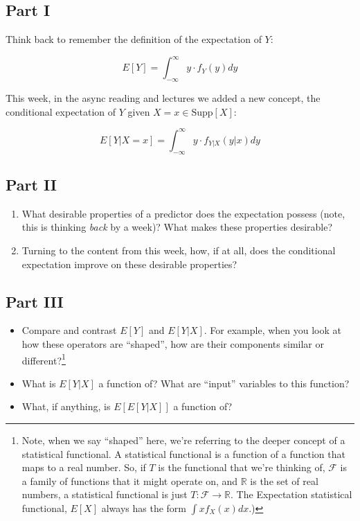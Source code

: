 \documentclass[
]{book}
\providecommand{\tightlist}{%
  \setlength{\itemsep}{0pt}\setlength{\parskip}{0pt}}
\theoremstyle{definition}
\theoremstyle{definition}
\theoremstyle{definition}
\theoremstyle{definition}
\theoremstyle{remark}
\begin{document}
\hypertarget{part-i}{%
\subsection{Part I}\label{part-i}}

Think back to remember the definition of the expectation of \(Y\):

\[
  E[Y] = \int_{-\infty}^\infty y \cdot f_{Y}(y) dy
\]

This week, in the async reading and lectures we added a new concept, the conditional expectation of \(Y\) given \(X=x \in \text{Supp}[X]\):

\[
  E[Y|X=x] =  \int_{-\infty}^\infty y \cdot f_{Y|X}(y|x) dy
\]

\hypertarget{part-ii}{%
\subsection{Part II}\label{part-ii}}

\begin{enumerate}
\def\labelenumi{\arabic{enumi}.}
\tightlist
\item
  What desirable properties of a predictor does the expectation possess (note, this is thinking \emph{back} by a week)? What makes these properties desirable?
\item
  Turning to the content from this week, how, if at all, does the conditional expectation improve on these desirable properties?
\end{enumerate}

\hypertarget{part-iii}{%
\subsection{Part III}\label{part-iii}}

\begin{itemize}
\item
  Compare and contrast \(E[Y]\) and \(E[Y|X]\). For example, when you look at how these operators are ``shaped'', how are their components similar or different?\footnote{Note, when we say ``shaped'' here, we're referring to the deeper concept of a statistical functional. A statistical functional is a function of a function that maps to a real number. So, if \(T\) is the functional that we're thinking of, \(\mathcal{F}\) is a family of functions that it might operate on, and \(\mathbb{R}\) is the set of real numbers, a statistical functional is just \(T: \mathcal{F} \rightarrow \mathbb{R}\). The Expectation statistical functional, \(E[X]\) always has the form \(\int x f_{X}(x)dx\).)}
\item
  What is \(E[Y|X]\) a function of? What are ``input'' variables to this function?
\item
  What, if anything, is \(E[E[Y|X]]\) a function of?
\end{itemize}
\end{document}
